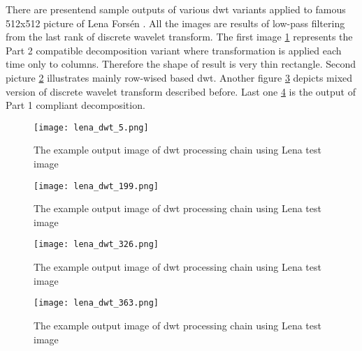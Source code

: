 There are presentend sample outputs of various dwt variants applied to famous 512x512 picture
of Lena Forsén \cite{lena}. All the images are results of low-pass filtering from the last
rank of discrete wavelet transform. The first image \ref{fig:lena_dwt_5} represents the Part 2
compatible decomposition variant where transformation is applied each time only to columns.
Therefore the shape of result is very thin rectangle. Second picture \ref{fig:lena_dwt_199}
illustrates mainly row-wised based dwt.
Another figure \ref{fig:lena_dwt_326} depicts mixed version of discrete wavelet transform described
before. Last one \ref{fig:lena_dwt_363} is the output of Part 1 compliant decomposition.

\begin{figure}
    \centering
    \texttt{[image: lena\_dwt\_5.png]}
    \caption{The example output image of dwt processing chain using Lena test image \cite{lena}}
    \label{fig:lena_dwt_5}
\end{figure}

\begin{figure}
    \centering
    \texttt{[image: lena\_dwt\_199.png]}
    \caption{The example output image of dwt processing chain using Lena test image \cite{lena}}
    \label{fig:lena_dwt_199}
\end{figure}

\begin{figure}
    \centering
    \texttt{[image: lena\_dwt\_326.png]}
    \caption{The example output image of dwt processing chain using Lena test image \cite{lena}}
    \label{fig:lena_dwt_326}
\end{figure}

\begin{figure}
    \centering
    \texttt{[image: lena\_dwt\_363.png]}
    \caption{The example output image of dwt processing chain using Lena test image \cite{lena}}
    \label{fig:lena_dwt_363}
\end{figure}
